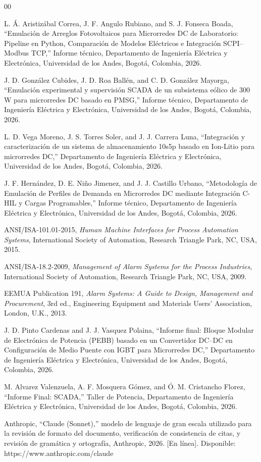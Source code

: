 \documentclass[conference]{IEEEtran}
\begin{document}
\begin{thebibliography}{00}

L. Á. Aristizábal Correa, J. F. Angulo Rubiano, and S. J. Fonseca Boada, ``Emulación de Arreglos Fotovoltaicos para Microrredes DC de Laboratorio: Pipeline en Python, Comparación de Modelos Eléctricos e Integración SCPI--Modbus TCP,'' Informe técnico, Departamento de Ingeniería Eléctrica y Electrónica, Universidad de los Andes, Bogotá, Colombia, 2026.

J. D. González Cubides, J. D. Roa Ballén, and C. D. González Mayorga, ``Emulación experimental y supervisión SCADA de un subsistema eólico de 300 W para microrredes DC basado en PMSG,'' Informe técnico, Departamento de Ingeniería Eléctrica y Electrónica, Universidad de los Andes, Bogotá, Colombia, 2026.

L. D. Vega Moreno, J. S. Torres Soler, and J. J. Carrera Luna, ``Integración y caracterización de un sistema de almacenamiento 10s5p basado en Ion-Litio para microrredes DC,'' Departamento de Ingeniería Eléctrica y Electrónica, Universidad de los Andes, Bogotá, Colombia, 2026.

J. F. Hernández, D. E. Niño Jimenez, and J. J. Castillo Urbano, ``Metodología de Emulación de Perfiles de Demanda en Microrredes DC mediante Integración C-HIL y Cargas Programables,'' Informe técnico, Departamento de Ingeniería Eléctrica y Electrónica, Universidad de los Andes, Bogotá, Colombia, 2026.

ANSI/ISA-101.01-2015, \emph{Human Machine Interfaces for Process Automation Systems}, International Society of Automation, Research Triangle Park, NC, USA, 2015.

ANSI/ISA-18.2-2009, \emph{Management of Alarm Systems for the Process Industries}, International Society of Automation, Research Triangle Park, NC, USA, 2009.

EEMUA Publication 191, \emph{Alarm Systems: A Guide to Design, Management and Procurement}, 3rd ed., Engineering Equipment and Materials Users' Association, London, U.K., 2013.

J. D. Pinto Cardenas and J. J. Vasquez Polaina, ``Informe final: Bloque Modular de Electrónica de Potencia (PEBB) basado en un Convertidor DC--DC en Configuración de Medio Puente con IGBT para Microrredes DC,'' Departamento de Ingeniería Eléctrica y Electrónica, Universidad de los Andes, Bogotá, Colombia, 2026.

M. Alvarez Valenzuela, A. F. Mosquera Gómez, and Ó. M. Cristancho Florez, ``Informe Final: SCADA,'' Taller de Potencia, Departamento de Ingeniería Eléctrica y Electrónica, Universidad de los Andes, Bogotá, Colombia, 2026.

Anthropic, ``Claude (Sonnet),'' modelo de lenguaje de gran escala utilizado para la revisión de formato del documento, verificación de consistencia de citas, y revisión de gramática y ortografía, Anthropic, 2026. [En línea]. Disponible: https://www.anthropic.com/claude

\end{thebibliography}
\end{document}
